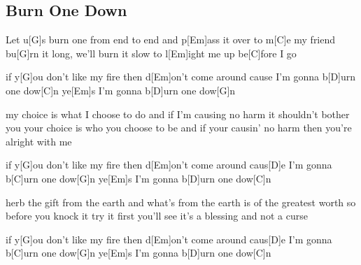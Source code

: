 \subsection*{Burn One Down   }
\begin{guitar}
Let u[G]s burn one from end to end
and p[Em]ass it over to m[C]e my friend
bu[G]rn it long, we'll burn it slow
to l[Em]ight me up be[C]fore I go 



if y[G]ou don't like my fire
then d[Em]on't come around
cause I'm gonna b[D]urn one dow[C]n
ye[Em]s I'm gonna b[D]urn one dow[G]n



my choice is what I choose to do
and if I'm causing no harm it shouldn't bother you
your choice is who you choose to be
and if your causin' no harm then you're alright with me 



if y[G]ou don't like my fire
then d[Em]on't come around
caus[D]e I'm gonna b[C]urn one dow[G]n
ye[Em]s I'm gonna b[D]urn one dow[C]n



herb the gift from the earth
and what's from the earth is of the greatest worth
so before you knock it try it first
you'll see it's a blessing and not a curse 



if y[G]ou don't like my fire
then d[Em]on't come around
caus[D]e I'm gonna b[C]urn one dow[G]n
ye[Em]s I'm gonna b[D]urn one dow[C]n
\end{guitar}
